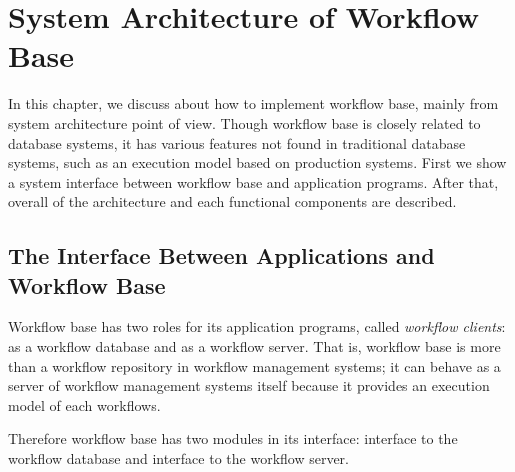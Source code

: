 
\chapter{System Architecture of Workflow Base}
\label{chap:arch}

In this chapter, we discuss about how to implement workflow base, mainly
from system architecture point of view.  Though workflow base is closely
related to database systems, it has various features not found in
traditional database systems, such as an execution model based on
production systems.  First we show a system interface between workflow
base and application programs.  After that, overall of the architecture
and each functional components are described.


%
%

\begin{sloppypar}
 \section{The Interface Between Applications and Workflow Base}
\end{sloppypar}

Workflow base has two roles for its application programs, called {\em
workflow clients}: as a workflow database and as a workflow server.
That is, workflow base is more than a workflow repository in workflow
management systems; it can behave as a server of workflow management
systems itself because it provides an execution model of each
workflows.

Therefore workflow base has two modules in its interface: interface to
the workflow database and interface to the workflow server.  

